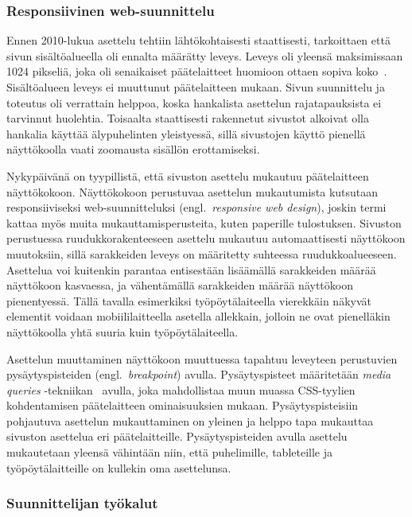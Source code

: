 \documentclass[finnish, 12pt, a4paper, elec, utf8, a-1b, online]{aaltothesis}
\begin{document}
\subsubsection{Responsiivinen web-suunnittelu}\label{responsive-web-design}

Ennen 2010-lukua asettelu tehtiin lähtökohtaisesti staattisesti, tarkoittaen
että sivun sisältöalueella oli ennalta määrätty leveys. Leveys oli yleensä
maksimissaan 1024 pikseliä, joka oli senaikaiset päätelaitteet huomioon ottaen sopiva
koko~\cite{viite?}. Sisältöalueen leveys ei muuttunut päätelaitteen mukaan. Sivun suunnittelu
ja toteutus oli verrattain helppoa, koska hankalista asettelun rajatapauksista
ei tarvinnut huolehtia. Toisaalta staattisesti rakennetut sivustot alkoivat olla
hankalia käyttää älypuhelinten yleistyessä, sillä sivustojen käyttö pienellä
näyttökoolla vaati zoomausta sisällön erottamiseksi.

Nykypäivänä on tyypillistä, että sivuston asettelu mukautuu päätelaitteen
näyttökokoon. Näyttökokoon perustuvaa asettelun mukautumista kutsutaan
responsiiviseksi web-suunnitteluksi (engl.~\textit{responsive web design}),
joskin termi kattaa myös muita mukauttamisperusteita, kuten paperille
tulostuksen. Sivuston perustuessa ruudukkorakenteeseen asettelu mukautuu
automaattisesti näyttökoon muutoksiin, sillä sarakkeiden leveys on määritetty
suhteessa ruudukkoalueeseen. Asettelua voi kuitenkin parantaa entisestään
lisäämällä sarakkeiden määrää näyttökoon kasvaessa, ja vähentämällä sarakkeiden
määrää näyttökoon pienentyessä. Tällä tavalla esimerkiksi työpöytälaiteella
vierekkäin näkyvät elementit voidaan mobiililaitteella asetella allekkain,
jolloin ne ovat pienelläkin näyttökoolla yhtä suuria kuin työpöytälaiteella.

Asettelun muuttaminen näyttökoon muuttuessa tapahtuu leveyteen perustuvien
pysäytyspisteiden (engl.~\textit{breakpoint}) avulla. Pysäytyspisteet
määritetään \textit{media queries} -tekniikan~\cite{Rivoal:12:MQ} avulla, joka
mahdollistaa muun muassa CSS-tyylien kohdentamisen päätelaitteen ominaisuuksien
mukaan. Pysäytyspisteisiin pohjautuva asettelun mukauttaminen on yleinen ja
helppo tapa mukauttaa sivuston asettelua eri päätelaitteille. Pysäytyspisteiden
avulla asettelu mukautetaan yleensä vähintään niin, että puhelimille,
tableteille ja työpöytälaitteille on kullekin oma asettelunsa.

\subsubsection{Suunnittelijan työkalut}
\end{document}
